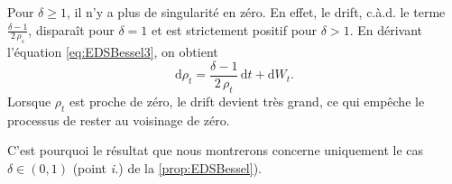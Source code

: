 \documentclass[openany]{book}
\newcommand{\R}{\mathbb{R}}
\newcommand{\1}{\mathbbm{1}}
\renewcommand{\d}{\mathrm{d}}
\theoremstyle{thmfont}
\theoremstyle{deffont}
\theoremstyle{thmfont}
\theoremstyle{deffont}
\newtheorem{remark}[remark]{Remarque}
\begin{document}
Pour $\delta \ge 1$, il n’y a plus de singularité en zéro. En effet, le drift, c.à.d. le terme $\frac{\delta-1}{2\,\rho_s}$, disparaît pour $\delta = 1$ et est strictement positif pour $\delta > 1$. En dérivant l’équation \eqref{eq:EDSBessel3}, on obtient
$$\d \rho_t = \frac{\delta-1}{2\,\rho_t} \,\d t + \d W_t.$$
Lorsque $\rho_t$ est proche de zéro, le drift devient très grand, ce qui empêche le processus de rester au voisinage de zéro.

C’est pourquoi le résultat que nous montrerons concerne uniquement le cas $\delta \in (0,1)$ (point \textit{i.}) de la \autoref{prop:EDSBessel}).
%
%    
\end{document}
